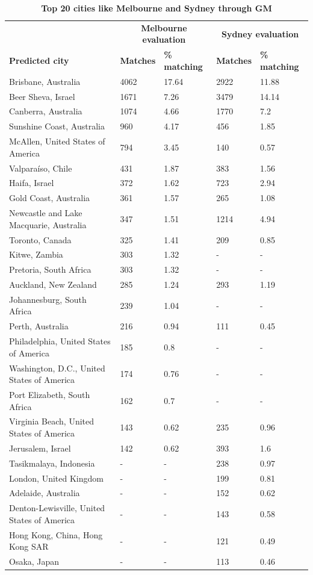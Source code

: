 \documentclass[10pt,letterpaper]{article}
\begin{document}
\begin{table}[!htbp]
\begin{adjustwidth}{-2.25in}{0in}
\caption{\bf Top 20 cities like Melbourne and Sydney through GM \label{tab:melbournesydneyGM}}     
\begin{tabular}{ l l l l l}
 \hline    &  \multicolumn{2}{c}{\textbf{Melbourne evaluation}} & \multicolumn{2}{c}{\textbf{Sydney evaluation}}  \\  
\textbf{Predicted city} & \textbf{Matches} & \textbf{\% matching}  & \textbf{Matches} & \textbf{\% matching}\\ \hline

Brisbane, Australia & 4062 & 17.64 & 2922 & 11.88      \\ 
Beer Sheva, Israel & 1671 & 7.26 & 3479 & 14.14      \\ 
Canberra, Australia & 1074 & 4.66 & 1770 & 7.2      \\
Sunshine Coast, Australia & 960 & 4.17 & 456 & 1.85      \\
McAllen, United States of America & 794 & 3.45 & 140 & 0.57      \\
Valpara\'{i}so, Chile & 431 & 1.87 & 383 & 1.56      \\
Haifa, Israel & 372 & 1.62 & 723 & 2.94      \\
Gold Coast, Australia & 361 & 1.57 & 265 & 1.08      \\
Newcastle and Lake Macquarie, Australia & 347 & 1.51 & 1214 & 4.94      \\
Toronto, Canada & 325 & 1.41 & 209 & 0.85      \\
Kitwe, Zambia & 303 & 1.32 & - & -      \\
Pretoria, South Africa & 303 & 1.32 & - & -      \\
Auckland, New Zealand & 285 & 1.24 & 293 & 1.19      \\
Johannesburg, South Africa & 239 & 1.04 & - & -      \\
Perth, Australia & 216 & 0.94 & 111 & 0.45      \\
Philadelphia, United States of America & 185 & 0.8 & - & -      \\
Washington, D.C., United States of America & 174 & 0.76 & - & -      \\
Port Elizabeth, South Africa & 162 & 0.7 & - & -      \\
Virginia Beach, United States of America & 143 & 0.62 & 235 & 0.96      \\
Jerusalem, Israel & 142 & 0.62 & 393 & 1.6      \\
Tasikmalaya, Indonesia & - & - & 238 & 0.97      \\		
London, United Kingdom & - & - & 199 & 0.81      \\
Adelaide, Australia & - & - & 152 & 0.62      \\
Denton-Lewisville, United States of America & - & - & 143 & 0.58      \\						
Hong Kong, China, Hong Kong SAR & - & - & 121 & 0.49      \\		
Osaka, Japan & - & - & 113 & 0.46      \\


\end{tabular}
\end{adjustwidth}
\end{table}
\end{document}
